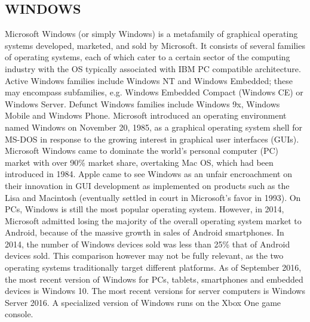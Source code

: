 \documentclass[12pt]{report} %
\begin{document}
\subsection{WINDOWS}
\label{subsec:WINDOWS}
Microsoft Windows (or simply Windows) \cite{Maluth:2012:MWG:2464833} is a metafamily of graphical operating systems developed, marketed, and sold by Microsoft. It consists of several families of operating systems, each of which cater to a certain sector of the computing industry with the OS typically associated with IBM PC compatible architecture. Active Windows families include Windows NT and Windows Embedded; these may encompass subfamilies, e.g. Windows Embedded Compact (Windows CE) or Windows Server. Defunct Windows families include Windows 9x, Windows Mobile and Windows Phone.
Microsoft introduced an operating environment named Windows on November 20, 1985, as a graphical operating system shell for MS-DOS in response to the growing interest in graphical user interfaces (GUIs). Microsoft Windows came to dominate the world's personal computer (PC) market with over 90\% market share, overtaking Mac OS, which had been introduced in 1984. Apple came to see Windows as an unfair encroachment on their innovation in GUI development as implemented on products such as the Lisa and Macintosh (eventually settled in court in Microsoft's favor in 1993). On PCs, 
Windows is still the most popular operating system. However, in 2014, Microsoft admitted losing the majority of the overall operating system market to Android, because of the massive growth in sales of Android smartphones. In 2014, the number of Windows devices sold was less than 25\% that of Android devices sold. This comparison however may not be fully relevant, as the two operating systems traditionally target different platforms.
As of September 2016, the most recent version of Windows for PCs, tablets, smartphones and embedded devices is Windows 10. The most recent versions for server computers is Windows Server 2016. A specialized version of Windows runs on the Xbox One game console.
\end{document}
